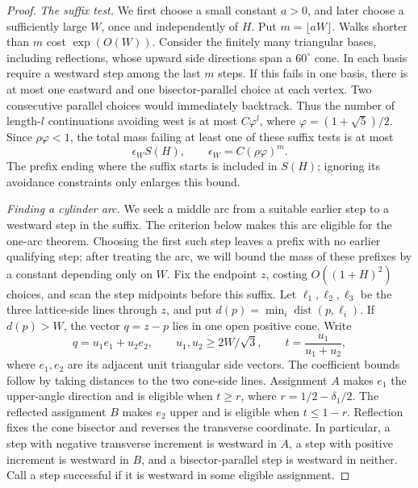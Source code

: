 \begin{proof}
\emph{The suffix test.}
We first choose a small constant \(a>0\), and later choose a sufficiently
large \(W\), once and independently of \(H\). Put
\(m=\lfloor aW\rfloor\). Walks shorter than \(m\) cost
\(\exp(O(W))\). Consider the finitely many triangular bases, including
reflections, whose upward side directions span a \(60^\circ\) cone.
In each basis require a westward step among the last \(m\) steps.
If this fails in one basis, there is at most one eastward and one
bisector-parallel choice at each vertex. Two consecutive parallel choices
would immediately backtrack. Thus the number of length-\(l\)
continuations avoiding west is at most \(C\varphi^l\), where
\(\varphi=(1+\sqrt5)/2\). Since \(\rho\varphi<1\), the total mass
failing at least one of these suffix tests is at most
\begin{equation}\label{eq:fullbox-suffix}
 \epsilon_W S(H),\qquad
 \epsilon_W=C(\rho\varphi)^m.
\end{equation}
The prefix ending where the suffix starts is included in \(S(H)\);
ignoring its avoidance constraints only enlarges this bound.

\smallskip\noindent\emph{Finding a cylinder arc.}
We seek a middle arc from a suitable earlier step to a westward step in
the suffix. The criterion below makes this arc eligible for the one-arc
theorem. Choosing the first such step leaves a prefix with no earlier
qualifying step; after treating the arc, we will bound the mass of these
prefixes by a constant depending only on \(W\).
Fix the endpoint \(z\), costing \(O((1+H)^2)\) choices, and scan the
step midpoints before this suffix. Let \(\ell_1,\ell_2,\ell_3\) be the
three lattice-side lines through \(z\), and put
\(d(p)=\min_i\operatorname{dist}(p,\ell_i)\). If \(d(p)>W\), the
vector \(q=z-p\) lies in one open positive cone. Write
\[
 q=u_1e_1+u_2e_2,
 \qquad u_1,u_2\ge 2W/\sqrt3,
 \qquad t=\frac{u_1}{u_1+u_2},
\]
where \(e_1,e_2\) are its adjacent unit triangular side vectors. The
coefficient bounds follow by taking distances to the two cone-side lines.
Assignment \(A\) makes \(e_1\) the upper-angle direction and is eligible
when \(t\ge r\), where \(r=1/2-\delta_1/2\). The reflected assignment
\(B\) makes \(e_2\) upper and is eligible when \(t\le1-r\). Reflection
fixes the cone bisector and reverses the transverse coordinate. In
particular, a step with negative transverse increment is westward in
\(A\), a step with positive increment is westward in \(B\), and a
bisector-parallel step is westward in neither. Call a step successful
if it is westward in some eligible assignment.


\end{proof}
